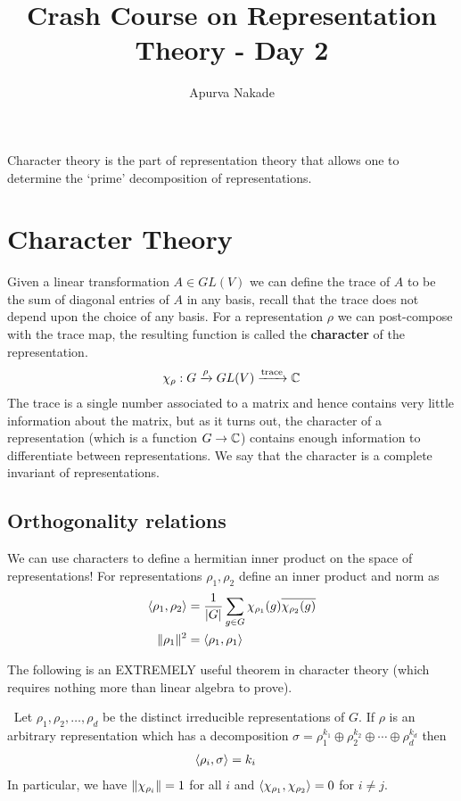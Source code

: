 



\DeclareMathOperator{\Ce}{Re}




\title{Crash Course on Representation Theory - Day 2}
\author{Apurva Nakade}
\thispagestyle{fancy}
\maketitle



Character theory is the part of representation theory that allows one to determine the `prime' decomposition of representations.

\section{Character Theory}
Given a linear transformation $A \in GL(V)$ we can define the trace of $A$ to be the sum of diagonal entries of $A$ in any basis, recall that the trace does not depend upon the choice of any basis. For a representation $\rho$ we can post-compose with the trace map, the resulting function is called the \textbf{character} of the representation.
\begin{align}
	\chi_{\rho}: G \xrightarrow{\rho} GL(V) \xrightarrow{\mathrm{trace}} \mathbb{C}
\end{align}
The trace is a single number associated to a matrix and hence contains very little information about the matrix, but as it turns out, the character of a representation (which is a function $G \rightarrow \mathbb{C}$) contains enough information to differentiate between representations. We say that the character is a complete invariant of representations.


\subsection{Orthogonality relations}
We can use characters to define a hermitian inner product on the space of representations! For representations $\rho_1, \rho_2$ define an inner product and norm as
\begin{align}
	\langle \rho_1, \rho_2 \rangle & = \dfrac{1}{|G|} \sum \limits _ {g \in G} {\chi_{\rho_1}(g)} \overline{\chi_{\rho_2}(g)} \\
	\lVert \rho_1 \rVert^2         & = \langle \rho_1, \rho_1 \rangle
\end{align}

The following is an EXTREMELY useful theorem in character theory (which requires nothing more than linear algebra to prove).
\begin{thm} $\:$
	Let $\rho_1, \rho_2, \ldots, \rho_d$ be the distinct irreducible representations of $G$. If $\rho$ is an arbitrary representation which has a decomposition $\sigma = \rho_1^{k_1} \oplus \rho_2^{k_2} \oplus \cdots \oplus \rho_d^{k_d} $ then
	\begin{align}
		\langle \rho_i, \sigma \rangle & = k_i
	\end{align}
	In particular, we have $\lVert \chi_{\rho_i} \rVert = 1$ for all $i$ and $\langle \chi_{\rho_1}, \chi_{\rho_2} \rangle = 0$ for $i \neq j$.
\end{thm}

